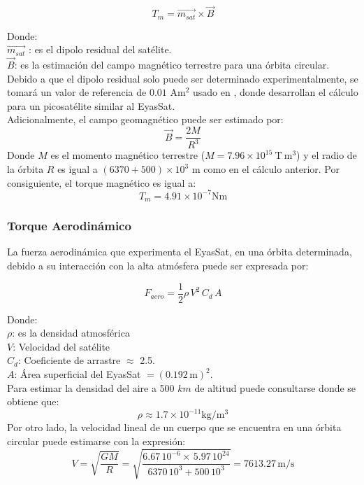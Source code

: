 \begin{equation}
	T_m = \vec{m_{sat}}\times\vec{B}\label{eq:torque_mag}	
\end{equation}


\noindent Donde:\\
$\vec{m_{sat}}$ : es el dipolo residual del satélite.\\
$\vec{B}$: es la estimación del campo magnético terrestre para una órbita circular.\\

Debido a que el dipolo residual solo puede ser determinado experimentalmente, se tomará un valor de referencia de $0.01$ $\mathrm{Am^2}$ usado en \cite{Giesselman2006}, donde desarrollan el cálculo  para un picosatélite similar al EyasSat.\\
Adicionalmente, el campo geomagnético puede ser estimado por:
\begin{equation}
	\vec{B} = \frac{2M}{R^3}\label{eq:campoMagnetico}
\end{equation}
Donde $M$ es el momento magnético terrestre ($M = 7.96\times10^{15}\:\mathrm{T\:m^3}$) y el radio de la órbita $R$ es igual a $(6370 + 500)\times10^3$ m como en el cálculo anterior. Por consiguiente, el torque magnético es igual a:
$$T_m = 4.91\times10^{-7} \mathrm{Nm}$$
	

\subsubsection{Torque Aerodinámico}
\hfill \break
La fuerza aerodinámica que experimenta el EyasSat, en una órbita determinada, debido a su interacción con la alta atmósfera puede ser expresada por:

\begin{equation}\label{eq:fuerza_aero}
	F_{aero} = \frac{1}{2}\rho\,V^2\,C_{d}\,A
\end{equation}

\noindent Donde:\\
$\rho$: es la densidad atmosférica\\
$V$: Velocidad del satélite \\
$C_d$: Coeficiente de arrastre $\approx$ 2.5.\\
$A$: Área superficial del EyasSat $= \left(0.192\,\mathrm{m}\right)^2$.\\
Para estimar la densidad del aire a 500 $km$ de altitud puede consultarse \cite{wertz2001mission} donde se obtiene que:
 $$\rho \approx 1.7\times10^{-11} \mathrm{kg/m^3}$$
 Por otro lado, la velocidad lineal de un cuerpo que se encuentra en una órbita circular puede estimarse con la expresión:
 $$ V = \sqrt{\frac{GM}{R}} = \sqrt{\frac{6.67\,10^{-6}\times\,5.97\,10^{24}}{6370\,10^3 +500\,10^3}} =7613.27\,\mathrm{m/s}$$

